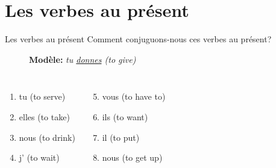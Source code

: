 \documentclass{beamer}
\begin{document}
  \section{Les verbes au présent}
    \begin{frame}{Les verbes au présent}
      Comment conjuguons-nous ces verbes au présent?
      \begin{description}
        \item[] \textbf{Modèle:} \emph{tu \underline{donnes} (to give)}
      \end{description}
      \begin{columns}
          \begin{enumerate}
            \item tu \underline{} (to serve)
            \item elles \underline{} (to take)
            \item nous \underline{} (to drink)
            \item j' \underline{} (to wait)
          \end{enumerate}
          \begin{enumerate}
            \setcounter{enumi}{4}
            \item vous \underline{} (to have to)
            \item ils \underline{} (to want)
            \item il \underline{} (to put)
            \item nous \underline{} (to get up)
          \end{enumerate}
      \end{columns}
    \end{frame}
\end{document}
